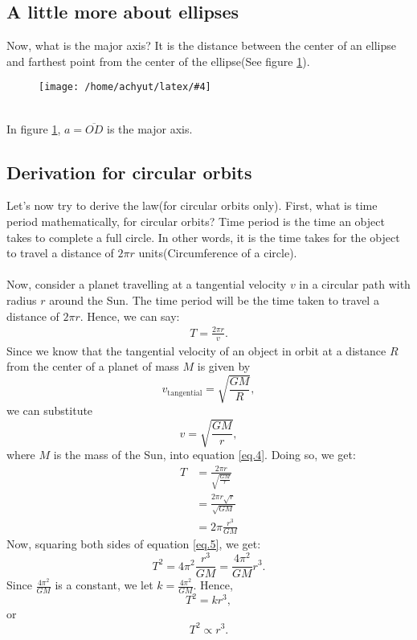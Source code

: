 \documentclass[a4paper]{report}
\newcommand{\mkfig}[5]{
  \begin{figure}[#1]
    \centering
    \texttt{[image: /home/achyut/latex/\#4]}
    \caption{\centering{#5}}
    \label{fig.#2}
  \end{figure}
}
\begin{document}
\subsection{A little more about ellipses}
Now, what is the major axis? It is the distance between the center of an ellipse and farthest point from the 
center of the ellipse(See figure \ref{fig.6}).
\mkfig{h!}{6}{2}{presentation.6.png}{Major axis of ellipse} \\
In figure \ref{fig.6}, $a=\overline{OD}$ is the major axis. \\

\subsection{Derivation for circular orbits}
Let's now try to derive the law(for circular orbits only).
First, what is time period mathematically, for circular orbits? Time period is the time an object takes to 
complete a full circle. In other words, it is the time takes for the object to travel a 
distance of $2\pi r$ units(Circumference of a circle).\\\\
Now, consider a planet travelling at a tangential velocity $v$ in a circular path with radius $r$ around the Sun. 
The time period will be the time taken to travel a distance of $2\pi r$. Hence, we can say: 
\begin{align}\label{eq.4}
T=\frac{2\pi r}{v}.
\end{align}
Since we know that the tangential velocity of an object in orbit at a distance $R$ from the center of a planet 
of mass $M$ is 
given by $$v_{\text{tangential}}=\sqrt{\frac{GM}{R}},$$
we can substitute $$v=\sqrt{\frac{GM}{r}},$$
where $M$ is the mass of the Sun, into equation \ref{eq.4}. Doing so, we get: 
\begin{equation} \label{eq.5}
  \begin{split}
    T &= \frac{2\pi r}{\sqrt{\frac{GM}{r}}} \\
    &= \frac{2\pi r\sqrt{r}}{\sqrt{GM}}\\
    &= 2\pi\frac{r^3}{GM}
  \end{split}
\end{equation}
Now, squaring both sides of equation \ref{eq.5}, we get: $$T^2=4\pi^2\frac{r^3}{GM}=\frac{4\pi^2}{GM}r^3.$$
Since $\frac{4\pi^2}{GM}$ is a constant, we let $k=\frac{4\pi^2}{GM}$. Hence, 
$$T^2=kr^3,$$ or $$\boxed{T^2\propto r^3}.$$
\end{document}
